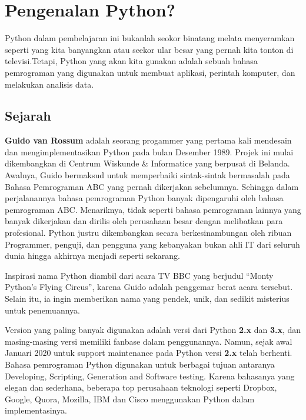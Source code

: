 \documentclass[
]{docs}
\begin{document}
\hypertarget{pengenalan-python}{%
\section*{Pengenalan Python?}\label{pengenalan-python}}

Python dalam pembelajaran ini bukanlah seokor binatang melata menyeramkan seperti yang kita banyangkan atau seekor ular besar yang pernah kita tonton di televisi.Tetapi, Python yang akan kita gunakan adalah sebuah bahasa pemrograman yang digunakan untuk membuat aplikasi, perintah komputer, dan melakukan analisis data.

\hypertarget{sejarah}{%
\subsection{Sejarah}\label{sejarah}}

\textbf{Guido van Rossum} adalah seorang progammer yang pertama kali mendesain dan mengimplementasikan Python pada bulan Desember 1989. Projek ini mulai dikembangkan di Centrum Wiskunde \& Informatice yang berpusat di Belanda. Awalnya, Guido bermaksud untuk memperbaiki sintak-sintak bermasalah pada Bahasa Pemrograman ABC yang pernah dikerjakan sebelumnya. Sehingga dalam perjalanannya bahasa pemrograman Python banyak dipengaruhi oleh bahasa pemrograman ABC. Menariknya, tidak seperti bahasa pemrograman lainnya yang banyak dikerjakan dan dirilis oleh perusahaan besar dengan melibatkan para profesional. Python justru dikembangkan secara berkesinambungan oleh ribuan Programmer, penguji, dan pengguna yang kebanyakan bukan ahli IT dari seluruh dunia hingga akhirnya menjadi seperti sekarang.

Inspirasi nama Python diambil dari acara TV BBC yang berjudul ``Monty Python's Flying Circus'', karena Guido adalah penggemar berat acara tersebut. Selain itu, ia ingin memberikan nama yang pendek, unik, dan sedikit misterius untuk penemuannya.

Version yang paling banyak digunakan adalah versi dari Python \textbf{2.x} dan \textbf{3.x}, dan masing-masing versi memiliki fanbase dalam penggunannya. Namun, sejak awal Januari 2020 untuk support maintenance pada Python versi \textbf{2.x} telah berhenti. Bahasa pemrograman Python digunakan untuk berbagai tujuan antaranya Developing, Scripting, Generation and Software testing. Karena bahasanya yang elegan dan sederhana, beberapa top perusahaan teknologi seperti Dropbox, Google, Quora, Mozilla, IBM dan Cisco menggunakan Python dalam implementasinya.
\end{document}

